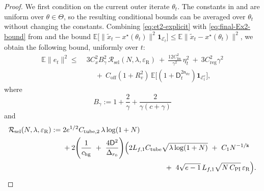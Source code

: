 \documentclass{article}
\theoremstyle{normaltheorem}
\newcommand{\dimk}{\texttt{k}}
\begin{document}
\begin{proof}
We first condition on the current outer iterate \(\theta_t\). The constants in  and
 are uniform over \(\theta\in\Theta\), so the resulting conditional bounds can be averaged over
\(\theta_t\) without changing the constants. Combining \eqref{eq:et2-explicit} with \eqref{eq:final-Ex2-bound} from
 and the bound
$\mathbb E\big[\|\tilde x_t-x^\star(\theta_t)\|^2\mathbf 1_{\mathcal E_t}\big]\le \mathbb E\|\tilde x_t-x^\star(\theta_t)\|^2$,
we obtain the following bound, uniformly over \(t\):
\begin{equation}\label{eq:et2-plugged}
\begin{aligned}
\mathbb E\|e_t\|^2
\le\;&
3C_x^2 B_\gamma^2\,\mathcal R_{\mathrm{sel}}(N,\lambda,\varepsilon_{\mathrm R})
\ +\ \frac{12C_{\mathrm{lin}}^2}{\gamma^2}\,\eta_t^2
\ +\ 3C_{\mathrm{reg}}^2\gamma^2\\
&\quad
\ +\ C_{\mathrm{off}}(1+R_v^2)\,
\mathbb E\big[(1+\mathsf{D}_{t}^{2\mathsf n_{\theta x}})\mathbf 1_{\mathcal E_t^c}\big],
\end{aligned}
\end{equation}
where
\[
B_\gamma
:=
1+\frac{2}{\gamma}+\frac{2}{\gamma(c+\gamma)}
\]
and
\begin{equation}\label{eq:Rsel-expanded}
\begin{aligned}
\mathcal R_{\mathrm{sel}}(N,\lambda,\varepsilon_{\mathrm R})
:=\;&
2e^{1/2}C_{\mathrm{tube},2}\,\lambda\log(1+N)\\
&+
2\Bigg(\frac{1}{c_{\mathrm{hg}}}
\ +\ \frac{4\mathsf D^2}{\Delta_{r_0}}\Bigg)
\Big(
2L_{f,1}C_{\mathrm{tube}}\sqrt{\lambda\log(1+N)}
\ +\ C_1N^{-1/\dimk}\\
&\hspace{4.9cm}
\ +\ 4\sqrt{e-1}\,L_{f,1}\sqrt{N\,C_{\mathrm{PI}}}\,\varepsilon_{\mathrm R}
\Big).
\end{aligned}
\end{equation}


\end{proof}
\end{document}
